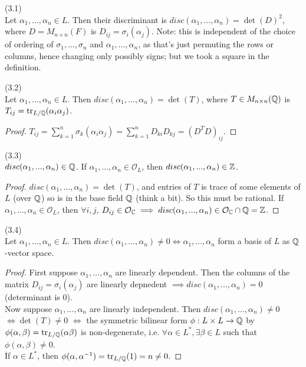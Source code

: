 \documentclass[a4paper]{article}
\begin{document}
\begin{defi} (3.1)\\
Let $\alpha_1,...,\alpha_n \in L$. Then their discriminant is $disc(\alpha_1,...,\alpha_n) = \det(D)^2$, where $D=M_{n\times n}(F)$ is $D_{ij} = \sigma_i (\alpha_j)$. Note: this is independent of the choice of ordering of $\sigma_1,...,\sigma_n$ and $\alpha_1,...,\alpha_n$, as that's just permuting the rows or columns, hence changing only possibly signs; but we took a square in the definition.
\end{defi}

\begin{lemma} (3.2)\\
Let $\alpha_1,...,\alpha_n \in L$. Then $disc(\alpha_1,...,\alpha_n) = \det(T)$, where $T \in M_{n \times n}(\mathbb{Q})$ is $T_{ij} = \operatorname{tr}_{L/\mathbb{Q}}(\alpha_i\alpha_j)$.
\begin{proof}
$T_{ij} = \sum_{k=1}^n \sigma_k (\alpha_i\alpha_j) = \sum_{k=1}^n D_{ki} D_{kj} = (D^T D)_{ij}$.
\end{proof}
\end{lemma}

\begin{coro} (3.3)\\
$disc(\alpha_1,...,\alpha_n) \in \mathbb{Q}$. If $\alpha_1,...,\alpha_n \in \mathcal{O}_L$, then $disc(\alpha_1,...,\alpha_n) \in \mathbb{Z}$.
\begin{proof}
$disc(\alpha_1,...,\alpha_n) = \det(T)$, and entries of $T$ is trace of some elements of $L$ (over $\mathbb{Q}$) so is in the base field $\mathbb{Q}$ (think a bit). So this must be rational. If $\alpha_1,...,\alpha_n \in \mathcal{O}_L$, then $\forall i,j$, $D_{ij} \in \mathcal{O}_{\mathbb{C}} \implies disc(\alpha_1,...,\alpha_n) \in \mathcal{O}_{\mathbb{C}} \cap \mathbb{Q} =\mathbb{Z}$.
\end{proof}
\end{coro}

\begin{prop} (3.4)\\
Let $\alpha_1,...,\alpha_n \in L$. Then $disc(\alpha_1,...,\alpha_n) \neq 0 \iff \alpha_1,...,\alpha_n$ form a basis of $L$ as $\mathbb{Q}$-vector space.\\
\begin{proof}
First suppose $\alpha_1,...,\alpha_n$ are linearly dependent. Then the columns of the matrix $D_{ij} = \sigma_i(\alpha_j)$ are linearly depnedent $\implies disc(\alpha_1,...,\alpha_n) = 0$ (determinant is 0).\\
Now suppose $\alpha_1,...,\alpha_n$ are linearly independent. Then $disc(\alpha_1,...,\alpha_n) \neq 0$ $\iff \det (T) \neq 0$ $\iff$ the symmetric bilinear form $\phi:L \times L \to \mathbb{Q}$ by $\phi(\alpha,\beta) = \operatorname{tr}_{L/\mathbb{Q}}(\alpha\beta)$ is non-degenerate, i.e. $\forall \alpha \in L^*, \exists \beta \in L$ such that $\phi(\alpha,\beta) \neq 0$.\\
If $\alpha \in L^*$, then $\phi(\alpha,\alpha^{-1}) = \operatorname{tr}_{L/\mathbb{Q}}(1) = n \neq 0$.
\end{proof}
\end{prop}
\end{document}
